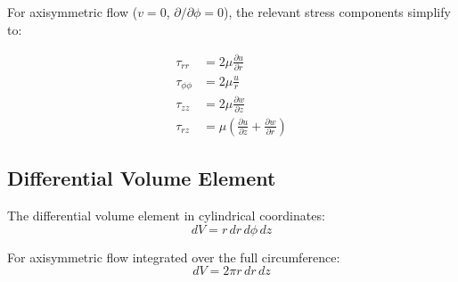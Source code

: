 For axisymmetric flow ($v = 0$, $\partial/\partial\phi = 0$), the relevant stress components simplify to:

\begin{align}
    \tau_{rr} &= 2\mu \frac{\partial u}{\partial r} \\
    \tau_{\phi\phi} &= 2\mu \frac{u}{r} \\
    \tau_{zz} &= 2\mu \frac{\partial w}{\partial z} \\
    \tau_{rz} &= \mu \left(\frac{\partial u}{\partial z} + \frac{\partial w}{\partial r}\right)
\end{align}

\subsection{Differential Volume Element}

The differential volume element in cylindrical coordinates:
\begin{equation}
    dV = r\,dr\,d\phi\,dz
\end{equation}

For axisymmetric flow integrated over the full circumference:
\begin{equation}
    dV = 2\pi r\,dr\,dz
\end{equation}
